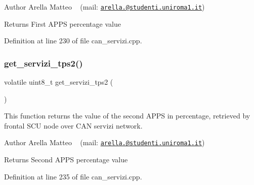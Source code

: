 \begin{DoxyAuthor}{Author}
Arella Matteo ~\newline
 (mail\+: \href{mailto:arella.1646983@studenti.uniroma1.it}{\tt arella.@studenti.\+uniroma1.\+it})
\end{DoxyAuthor}
\begin{DoxyReturn}{Returns}
First A\+P\+PS percentage value 
\end{DoxyReturn}


Definition at line 230 of file can\+\_\+servizi.\+cpp.

\mbox{\label{group___c_a_n__servizi__group_ga431b31efe978864b1a2db0d57a5b572a}} 
\subsubsection{\texorpdfstring{get\+\_\+servizi\+\_\+tps2()}{get\_servizi\_tps2()}}
{\footnotesize\ttfamily volatile uint8\+\_\+t get\+\_\+servizi\+\_\+tps2 (\begin{DoxyParamCaption}{ }\end{DoxyParamCaption})}



This function returns the value of the second A\+P\+PS in percentage, retrieved by frontal S\+CU node over C\+AN servizi network. 

\begin{DoxyAuthor}{Author}
Arella Matteo ~\newline
 (mail\+: \href{mailto:arella.1646983@studenti.uniroma1.it}{\tt arella.@studenti.\+uniroma1.\+it})
\end{DoxyAuthor}
\begin{DoxyReturn}{Returns}
Second A\+P\+PS percentage value 
\end{DoxyReturn}


Definition at line 235 of file can\+\_\+servizi.\+cpp.

\mbox{\label{group___c_a_n__servizi__group_ga68bca94de95a77a3366f46eed661193f}} 

